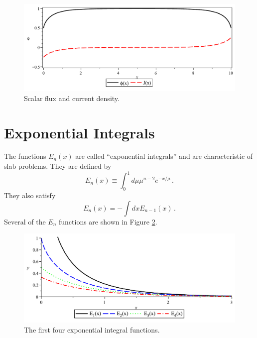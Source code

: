 \begin{figure}[ht] 
    \centering
    \includegraphics[keepaspectratio, width = 5.0 in]{images/slab_example_phi_current}
    \caption{Scalar flux and current density.}
    \label{fig:slab_example_phi_current}
\end{figure}

\section*{Exponential Integrals}

The functions $E_n(x)$ are called ``exponential integrals'' and are characteristic of slab problems.  They are defined by
\begin{equation}
 E_n(x) \equiv \int^1_0 d\mu \mu^{n-2} e^{-x/\mu} \, .
 \label{eq:EnDefinition}
\end{equation}
They also satisfy
\begin{equation}
 E_n(x) = - \int dx E_{n-1}(x) \, .
 \label{eq:EnIntegration}
\end{equation}
Several of the $E_n$ functions are shown in Figure \ref{fig:slab_example_exp_functions}.

\begin{figure}[ht] 
    \centering
    \includegraphics[keepaspectratio, width = 5.0 in]{images/slab_example_exp_functions}
    \caption{The first four exponential integral functions.}
    \label{fig:slab_example_exp_functions}
\end{figure}

